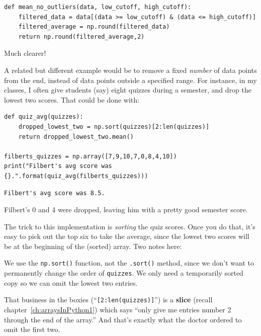 \begin{Verbatim}[fontsize=\small,samepage=true,frame=single,framesep=3mm]
def mean_no_outliers(data, low_cutoff, high_cutoff):
    filtered_data = data[(data >= low_cutoff) & (data <= high_cutoff)]
    filtered_average = np.round(filtered_data)
    return np.round(filtered_average,2)
\end{Verbatim}

Much clearer!

\medskip

A related but different example would be to remove a fixed \textit{number} of
data points from the end, instead of data points outside a specified range. For
instance, in my classes, I often give students (say) eight quizzes during a
semester, and drop the lowest two scores. That could be done with:


\begin{Verbatim}[fontsize=\small,samepage=true,frame=single,framesep=3mm]
def quiz_avg(quizzes):
    dropped_lowest_two = np.sort(quizzes)[2:len(quizzes)]
    return dropped_lowest_two.mean()

filberts_quizzes = np.array([7,9,10,7,0,8,4,10])
print("Filbert's avg score was {}.".format(quiz_avg(filberts_quizzes)))
\end{Verbatim}
\vspace{-.2in}

\begin{Verbatim}[fontsize=\small,samepage=true,frame=leftline,framesep=5mm,framerule=1mm]
Filbert's avg score was 8.5.
\end{Verbatim}

Filbert's 0 and 4 were dropped, leaving him with a pretty good semester score.

The trick to this implementation is \textit{sorting} the quiz scores. Once you
do that, it's easy to pick out the top six to take the average, since the
lowest two scores will be at the beginning of the (sorted) array. Two notes
here:


\begin{compactitem}
\item We use the \texttt{np.sort()} function, not the \texttt{.sort()} method,
since we don't want to permanently change the order of \texttt{quizzes}. We
only need a temporarily sorted copy so we can omit the lowest two entries.
\item That business in the boxies (``\texttt{[2:len(quizzes)]}'') is a
\textbf{slice} (recall chapter~\ref{ch:arraysInPython1}) which says ``only give
me entries number 2 through the end of the array.'' And that's exactly what the
doctor ordered to omit the first two.
\end{compactitem}

